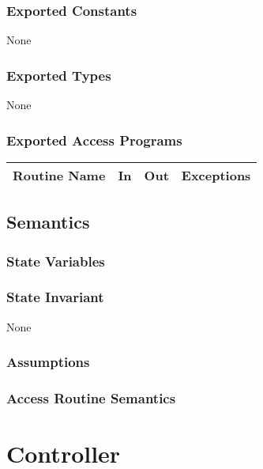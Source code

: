 \documentclass[12pt]{article}
\begin{document}
\subsubsection* {Exported Constants}

None

\subsubsection* {Exported Types}

None

\subsubsection* {Exported Access Programs}

\begin{tabular}{|l|p{2cm}|p{2cm}|p{5cm}|}
\hline
\textbf{Routine Name} & \textbf{In} & \textbf{Out} & \textbf{Exceptions} \\ \hline
\end{tabular}

\subsection* {Semantics}

\subsubsection* {State Variables}


\subsubsection* {State Invariant}

None

\subsubsection* {Assumptions}

\subsubsection* {Access Routine Semantics}



\newpage

\section* {Controller}
\end{document}
